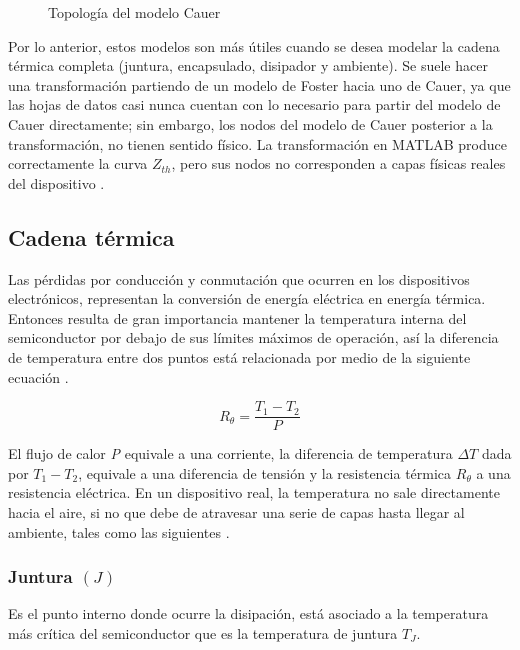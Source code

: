 \documentclass[journal]{IEEEtran}
\begin{document}
    \begin{figure}[H]
        \centering
        
        \caption{Topología del modelo Cauer}
    \label{fig:circuito_cauer}
    \end{figure}

    Por lo anterior, estos modelos son más útiles cuando se desea modelar la cadena térmica
    completa (juntura, encapsulado, disipador y ambiente). Se suele hacer una transformación 
    partiendo de un modelo de Foster hacia uno de Cauer, ya que las hojas de datos casi nunca 
    cuentan con lo necesario para partir del modelo de Cauer directamente; sin embargo, los 
    nodos del modelo de Cauer posterior a la transformación, no tienen sentido físico. La 
    transformación en MATLAB produce correctamente la curva \emph{$Z_{th}$}, pero sus nodos 
    no corresponden a capas físicas reales del dispositivo \cite{schutze2008thermal}.

\subsection{Cadena térmica}
Las pérdidas por conducción y conmutación que ocurren en los dispositivos electrónicos, representan la conversión
de energía eléctrica en energía térmica. Entonces resulta de gran importancia mantener la temperatura interna 
del semiconductor por debajo de sus límites máximos de operación, así la diferencia de temperatura entre dos puntos 
está relacionada por medio de la siguiente ecuación \cite{hart2011power}.

\begin{equation}
    R_{\theta} = \frac{T_1 - T_2}{P}
\end{equation}

El flujo de calor \emph{P} equivale a una corriente, la diferencia de 
temperatura \emph{$\Delta T$} dada por \emph{$T_1 - T_2$}, equivale a una 
diferencia de tensión y la resistencia térmica \emph{$R_{\theta}$} a una
resistencia eléctrica. En un dispositivo real, la temperatura no sale 
directamente hacia el aire, si no que debe de atravesar una serie 
de capas hasta llegar al ambiente, tales como las siguientes \cite{hart2011power}.

    \subsubsection{Juntura \emph{$(J)$}}
    Es el punto interno donde ocurre la disipación, está asociado
    a la temperatura más crítica del semiconductor que es la temperatura 
    de juntura \emph{$T_J$}.
\end{document}
